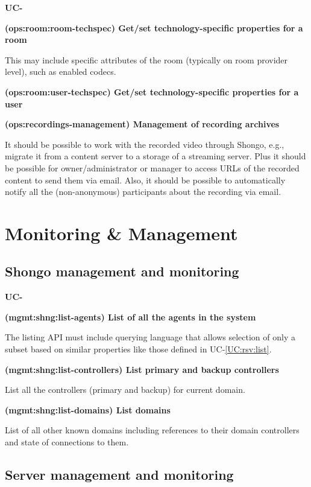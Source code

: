 \documentclass[a4paper]{report}
\makeatletter
\newcounter{UCcounter}
\newenvironment{UseCases}%
	{\begin{list}{\textbf{UC-\arabic{UCcounter}}}{\@nmbrlisttrue\def\@listctr{UCcounter}}}%
	{\end{list}}
\newcommand{\UClabel}[1]{\label{UC:#1}}
\newcommand{\UCref}[1]{UC-\ref{UC:#1}}
\newcommand{\UseCase}[2]{\item\UClabel{#2} \textbf{(#2) #1}\\ \nopagebreak}
\makeatother
\begin{document}
\begin{UseCases}
\UseCase{Get/set technology-specific properties for a
room}{ops:room:room-techspec}

This may include specific attributes of the room (typically on room provider
level), such as enabled codecs.

\UseCase{Get/set technology-specific properties for a
user}{ops:room:user-techspec}

\UseCase{Management of recording archives}{ops:recordings-management}

It should be possible to work with the recorded video through Shongo, e.g.,
migrate it from a content server to a storage of a streaming server. Plus it
should be possible for owner/administrator or manager to access URLs of the
recorded content to send them via email. Also, it should be possible to
automatically notify all the (non-anonymous) participants about the recording
via email.

\end{UseCases}



\section{Monitoring \& Management}

\subsection{Shongo management and monitoring}

\begin{UseCases}

\UseCase{List of all the agents in the system}{mgmt:shng:list-agents}

The listing API must include querying language that allows selection of only
a subset based on similar properties like those defined in \UCref{rsv:list}.

\UseCase{List primary and backup controllers}{mgmt:shng:list-controllers}

List all the controllers (primary and backup) for current domain.

\UseCase{List domains}{mgmt:shng:list-domains}

List of all other known domains including references to their domain
controllers and state of connections to them.

\end{UseCases}

\subsection{Server management and monitoring}
\end{document}
